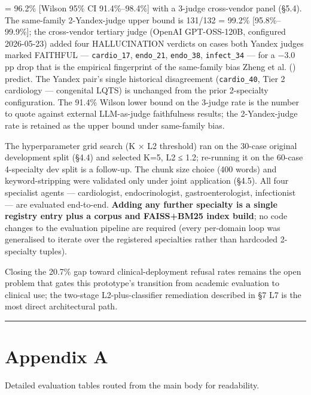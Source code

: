 \documentclass[
  american,
  a4paper,
]{article}
\begin{document}
\begin{itemize}
{  = 96.2\% {[}Wilson 95\% CI 91.4\%--98.4\%{]}} with a 3-judge
  cross-vendor panel (§5.4). The same-family 2-Yandex-judge upper bound
  is 131/132 = 99.2\% {[}95.8\%--99.9\%{]}; the cross-vendor tertiary
  judge (OpenAI GPT-OSS-120B, configured 2026-05-23) added four
  HALLUCINATION verdicts on cases both Yandex judges marked FAITHFUL ---
  \texttt{cardio\_17}, \texttt{endo\_21}, \texttt{endo\_38},
  \texttt{infect\_34} --- for a −3.0 pp drop that is the empirical
  fingerprint of the same-family bias Zheng et al.
  () predict. The Yandex pair's
  single historical disagreement (\texttt{cardio\_40}, Tier 2 cardiology
  --- congenital LQTS) is unchanged from the prior 2-specialty
  configuration. The 91.4\% Wilson lower bound on the 3-judge rate is
  the number to quote against external LLM-as-judge faithfulness
  results; the 2-Yandex-judge rate is retained as the upper bound under
  same-family bias.
\end{itemize}

The hyperparameter grid search (K × L2 threshold) ran on the 30-case
original development split (§4.4) and selected K=5, L2 ≤ 1.2; re-running
it on the 60-case 4-specialty dev split is a follow-up. The chunk size
choice (400 words) and keyword-stripping were validated only under joint
application (§4.5). All four specialist agents --- cardiologist,
endocrinologist, gastroenterologist, infectionist --- are evaluated
end-to-end. \textbf{Adding any further specialty is a single registry
entry plus a corpus and FAISS+BM25 index build}; no code changes to the
evaluation pipeline are required (every per-domain loop was generalised
to iterate over the registered specialties rather than hardcoded
2-specialty tuples).

Closing the 20.7\% gap toward clinical-deployment refusal rates remains
the open problem that gates this prototype's transition from academic
evaluation to clinical use; the two-stage L2-plus-classifier remediation
described in §7 L7 is the most direct architectural path.

\begin{center}\rule{0.5\linewidth}{0.5pt}\end{center}

\section{Appendix A}\label{appendix-a}

Detailed evaluation tables routed from the main body for readability.
\end{document}
